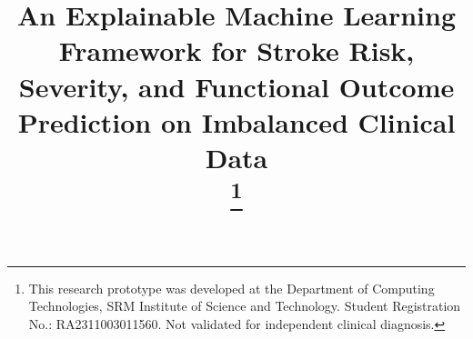 \documentclass[conference]{IEEEtran}
\begin{document}
\title{An Explainable Machine Learning Framework for Stroke Risk, Severity, and Functional Outcome Prediction on Imbalanced Clinical Data\\
\thanks{This research prototype was developed at the Department of Computing Technologies, SRM Institute of Science and Technology. Student Registration No.: RA2311003011560. Not validated for independent clinical diagnosis.}
}

\author{
}

\maketitle
\end{document}
